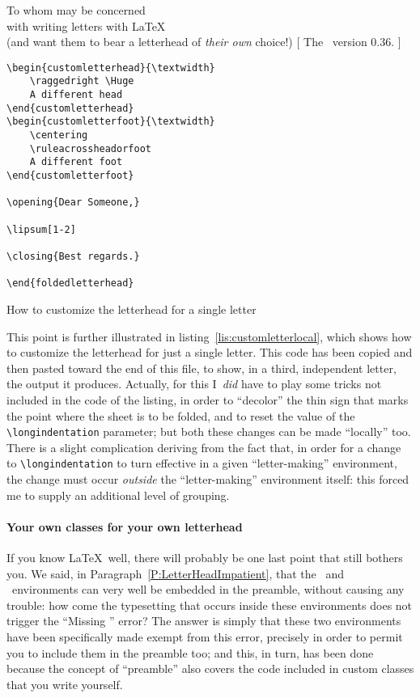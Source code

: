 \begin{letterhead}{
	To whom may be concerned\\
	with writing letters with \LaTeX\\
	(and want them to bear a letterhead
	of \emph{their own} choice!)
}[
	The \Bundle\ version 0.36.
]
\begin{listing}[tbp]
\begin{verbatim}
\begin{customletterhead}{\textwidth}
    \raggedright \Huge
    A different head
\end{customletterhead}
\begin{customletterfoot}{\textwidth}
    \centering
    \ruleacrossheadorfoot
    A different foot
\end{customletterfoot}

\opening{Dear Someone,}

\lipsum[1-2]

\closing{Best regards.}

\end{foldedletterhead}
\end{verbatim}
	\caption{How to customize the letterhead for a single letter}
	\label{lis:customletterlocal}
	\cleanbot
\end{listing}

This point is further illustrated in listing~\ref{lis:customletterlocal}, which
shows how to customize the letterhead for just a single letter.  This code has
been copied and then pasted toward the end of this file, to show, in a third,
independent letter, the output it produces.  Actually, for this I~\emph{did}
have to play some tricks not included in the code of the listing, in order to
``decolor'' the thin sign that marks the point where the sheet is to be folded,
and to reset the value of the \verb|\longindentation| parameter; but both these
changes can be made ``locally'' too.  There is a slight complication deriving
from the fact that, in order for a change to \verb|\longindentation| to turn
effective in a given ``letter-making'' environment, the change must occur
\emph{outside} the ``letter-making'' environment itself: this forced me to
supply an additional level of grouping.



\paragraph{Your own classes for your own letterhead}
\label{P:Classes}

If you know \LaTeX\ well, there will probably be one last point that still
bothers you.  We said, in Paragraph~\ref{P:LetterHeadImpatient}, that the \eclh\
and \eclf\ environments can very well be embedded in the preamble, without
causing any trouble: how come the typesetting that occurs inside these
environments does not trigger the ``Missing \verb||'' error?
The answer is simply that these two environments have been specifically made
exempt from this error, precisely in order to permit you to include them in the
preamble too; and this, in turn, has been done because the concept of
``preamble'' also covers the code included in custom classes that you write
yourself.


\end{letterhead}
